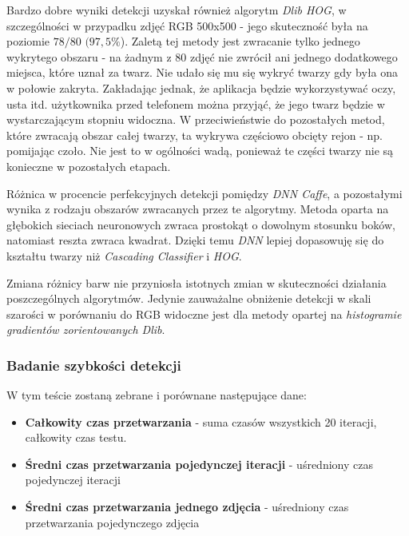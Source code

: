 \par
Bardzo dobre wyniki detekcji uzyskał również algorytm \textit{Dlib HOG}, w szczególności w przypadku zdjęć RGB 500x500 - jego skuteczność była na poziomie $78/80$ $(97,5 \%$). Zaletą tej metody jest zwracanie tylko jednego wykrytego obszaru - na żadnym z 80 zdjęć nie zwrócił ani jednego dodatkowego miejsca, które uznał za twarz. Nie udało się mu się wykryć twarzy gdy była ona w połowie zakryta. Zakładając jednak, że aplikacja będzie wykorzystywać oczy, usta itd. użytkownika przed telefonem można przyjąć, że jego twarz będzie w wystarczającym stopniu widoczna. W przeciwieństwie do pozostałych metod, które zwracają obszar całej twarzy, ta wykrywa częściowo obcięty rejon - np. pomijając czoło. Nie jest to w ogólności wadą, ponieważ te części twarzy nie są konieczne w pozostałych etapach.

\vspace{5mm}
Różnica w procencie perfekcyjnych detekcji pomiędzy \textit{DNN Caffe}, a pozostałymi wynika z rodzaju obszarów zwracanych przez te algorytmy. Metoda oparta na głębokich sieciach neuronowych zwraca prostokąt o dowolnym stosunku boków, natomiast reszta zwraca kwadrat. Dzięki temu \textit{DNN} lepiej dopasowuję się do kształtu twarzy niż \textit{Cascading Classifier} i \textit{HOG}.

\vspace{5mm}
Zmiana różnicy barw nie przyniosła istotnych zmian w skuteczności działania poszczególnych algorytmów. Jedynie zauważalne obniżenie detekcji w skali szarości w porównaniu do RGB widoczne jest dla metody opartej na \textit{histogramie gradientów zorientowanych Dlib}.

\subsubsection{Badanie szybkości detekcji}

W tym teście zostaną zebrane i porównane następujące dane:

\begin{itemize}
    \item \textbf{Całkowity czas przetwarzania} - suma czasów wszystkich 20 iteracji, całkowity czas testu.
    \item \textbf{Średni czas przetwarzania pojedynczej iteracji} - uśredniony czas pojedynczej iteracji
    \item \textbf{Średni czas przetwarzania jednego zdjęcia} - uśredniony czas przetwarzania pojedynczego zdjęcia
\end{itemize}


